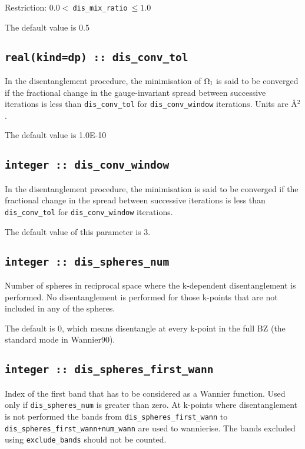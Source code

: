 Restriction: $0.0<\:${\tt dis\_mix\_ratio}$\:\leq 1.0$

The default value is 0.5 

\subsection[dis\_conv\_tol]{\tt real(kind=dp) :: dis\_conv\_tol}

In the disentanglement procedure, the minimisation of $\Omega_{\mathrm{I}}$ is said
to be converged if the fractional change in the gauge-invariant spread
between successive iterations is less than
\verb#dis_conv_tol# for \verb#dis_conv_window# iterations. Units are \AA$^2$.

The default value is 1.0E-10


\subsection[dis\_conv\_window]{\tt integer :: dis\_conv\_window}

In the disentanglement procedure, the minimisation is said to be converged
if the fractional change in the spread between successive
iterations is less than
\verb#dis_conv_tol# for \verb#dis_conv_window# iterations.

The default value of this parameter is 3.

\subsection[dis\_spheres\_num]{\tt integer :: dis\_spheres\_num}
Number of spheres in reciprocal space where the k-dependent
disentanglement is performed. No disentanglement is performed for 
those k-points that are not included in any of the spheres.

The default is 0, which means disentangle at every k-point in the full BZ (the standard mode in Wannier90).


\subsection[dis\_spheres\_first\_wann]{\tt integer :: dis\_spheres\_first\_wann}
Index of the first band that has to be considered as a Wannier function. Used only if {\tt dis\_spheres\_num} is greater than zero.
At k-points where disentanglement is not performed the bands from
{\tt dis\_spheres\_first\_wann} to {\tt dis\_spheres\_first\_wann+num\_wann} are used
to wannierise. The bands excluded using {\tt exclude\_bands} should not
be counted.


